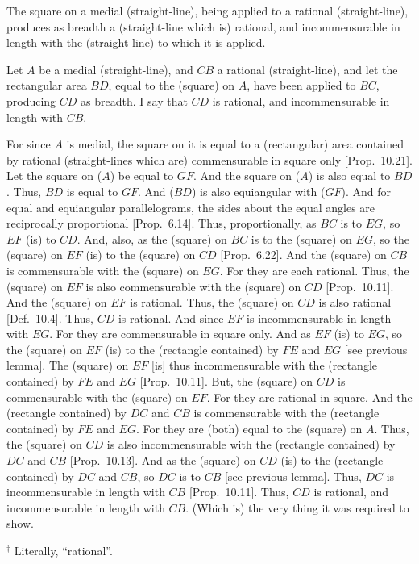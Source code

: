 \begin{Parallel}{}{}
{The square on a medial (straight-line), being
applied to a rational (straight-line), produces as breadth a (straight-line which
is) rational, and incommensurable in length with the (straight-line) to which it is applied.

\epsfysize=2in
\centerline{}

Let $A$ be a medial (straight-line), and $CB$ a rational (straight-line),
and let the rectangular area $BD$, equal to the (square) on $A$, have
been applied to $BC$, producing $CD$ as breadth. I say that
$CD$ is rational, and incommensurable in  length with $CB$.

For since $A$ is medial, the square on it is equal to a (rectangular) area
contained by rational (straight-lines which are) commensurable in square
only [Prop.~10.21]. Let the square on ($A$) be equal
to $GF$. And the square on ($A$) is also equal to $BD$. Thus, $BD$
is equal to $GF$. And ($BD$) is also equiangular with ($GF$). And for equal and
equiangular parallelograms, the sides about the equal angles are
reciprocally proportional [Prop.~6.14]. 
Thus, proportionally,  as $BC$ is to $EG$, so $EF$ (is) to $CD$.
And, also, as the (square) on $BC$ is to the (square) on $EG$, so
the (square) on $EF$ (is) to the (square) on $CD$ [Prop.~6.22]. 
And the (square) on $CB$ is commensurable with the (square) on $EG$.
For they are each rational. Thus, the (square) on $EF$ is also commensurable
with the (square) on $CD$ [Prop.~10.11]. And
the (square) on $EF$ is rational. Thus, the (square) on $CD$ is also rational
[Def.~10.4]. Thus, $CD$ is rational.
And since $EF$ is incommensurable in length with
$EG$. For they are commensurable in square only. And as $EF$ (is) to $EG$,
so the (square) on $EF$ (is) to the (rectangle contained) by $FE$ and $EG$ 
[see previous lemma]. The (square) on $EF$ [is] thus incommensurable with the (rectangle contained) by $FE$ and $EG$ [Prop.~10.11]. But, the (square) on $CD$
is commensurable with the (square) on $EF$. For they are rational
in square.
And the (rectangle contained) by $DC$ and $CB$ is commensurable
with the (rectangle contained) by $FE$ and $EG$. For they are (both)
equal to the (square) on $A$. Thus, the (square) on $CD$ is also
incommensurable with the (rectangle contained) by $DC$ and $CB$
[Prop.~10.13]. And as the (square) on $CD$
(is) to the (rectangle contained) by $DC$ and $CB$, so $DC$ is to $CB$ [see
previous lemma]. Thus, $DC$ is incommensurable in length with $CB$
[Prop.~10.11]. Thus, $CD$ is rational, and
incommensurable in length with $CB$. (Which is) the very thing it was required to show.}
\end{Parallel}
{\footnotesize\noindent$^\dag$  Literally, ``rational''.}

